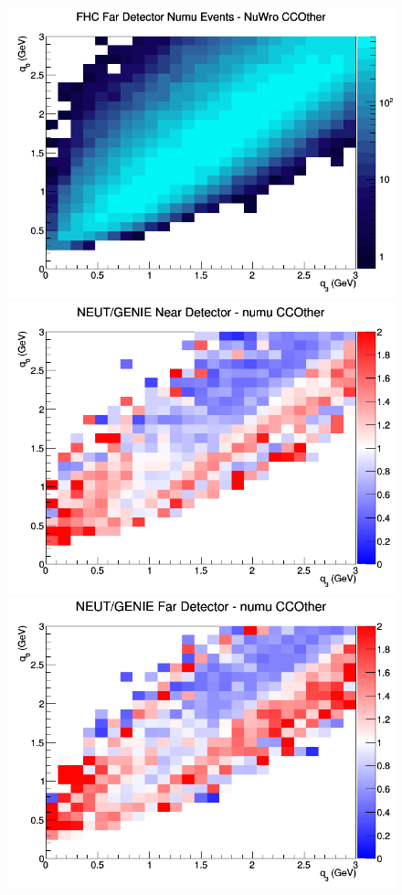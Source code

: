 \begin{figure}[h]
\endminipage
{}
\includegraphics[width=\linewidth]{eff_q0_q3/FGT/CCOther_FHC_FD_numu_q3_q0_NuWro.png}
\endminipage
\newline
{}
\includegraphics[width=\linewidth]{eff_q0_q3/FGT/ratios/CCOther_NEUT_GENIE_numu_near_q3_q0.png}
\endminipage
{}
\includegraphics[width=\linewidth]{eff_q0_q3/FGT/ratios/CCOther_NEUT_GENIE_numu_far_q3_q0.png}

\end{figure}
